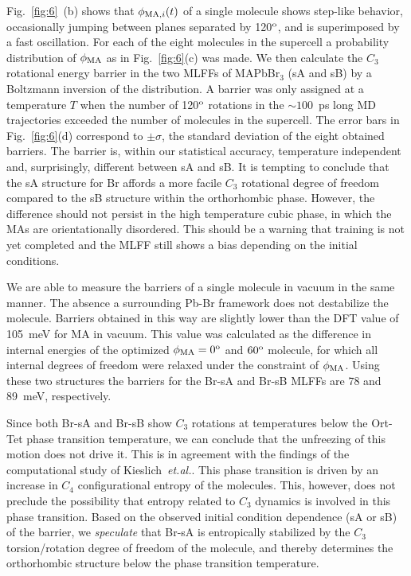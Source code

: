 \documentclass[journal=jpccck,manuscript=article,layout=twocolumn]{achemso}
\begin{document}
Fig.~\ref{fig:6}~(b) shows that $\phi_{{\rm MA},i}(t)$ of a single molecule shows step-like behavior, occasionally jumping between planes separated by 120$^{\rm o}$, and is superimposed by a fast oscillation. For each of the eight molecules in the supercell a probability distribution of $\phi_{\rm MA}$ as in Fig.~\ref{fig:6}(c) was made. We then calculate the $C_3$ rotational energy barrier in the two MLFFs of MAPbBr$_3$ (sA and sB) by a Boltzmann inversion of the distribution. A barrier was only assigned at a temperature $T$ when the number of 120$^{\rm o}$ rotations in the $\sim100$~ps long MD trajectories exceeded the number of molecules in the supercell. The error bars in Fig.~\ref{fig:6}(d) correspond to $\pm\sigma$, the standard deviation of the eight obtained barriers. The barrier is, within our statistical accuracy, temperature independent and, surprisingly, different between sA and sB. It is tempting to conclude that the sA structure for Br affords a more facile $C_3$ rotational degree of freedom compared to the sB structure within the orthorhombic phase. However, the difference should not persist in the high temperature cubic phase, in which the MAs are orientationally disordered. This should be a warning that training is not yet completed and the MLFF still shows a bias depending on the initial conditions.

We are able to measure the barriers of a single molecule in vacuum in the same manner. The absence a surrounding Pb-Br framework does not destabilize the molecule. Barriers obtained in this way are slightly lower than the DFT value of 105~meV for MA in vacuum. This value was calculated as the difference in internal energies of the optimized $\phi_{\rm MA}=0^{\rm o}$ and $60^{\rm o}$ molecule, for which all internal degrees of freedom were relaxed under the constraint of $\phi_{\rm MA}$. Using these two structures the barriers for the Br-sA and Br-sB MLFFs are 78 and 89~meV, respectively.



Since both Br-sA and Br-sB show $C_3$ rotations at temperatures below the Ort-Tet phase transition temperature, we can conclude that the unfreezing of this motion does not drive it. This is in agreement with the findings of the computational study of Kieslich~\textit{et.al.}\cite{Kieslich:com18}. This phase transition is driven by an increase in $C_4$ configurational entropy of the molecules\cite{Onoda-Yamamuro:jpcs90}. This, however, does not preclude the possibility that entropy related to $C_3$ dynamics is involved in this phase transition. Based on the observed initial condition dependence (sA or sB) of the barrier, we \textit{speculate} that Br-sA is entropically stabilized by the $C_3$ torsion/rotation degree of freedom of the molecule, and thereby determines the orthorhombic structure below the phase transition temperature.
\end{document}
